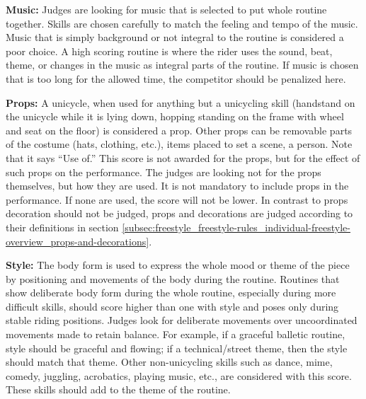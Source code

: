 \textbf{Music:} Judges are looking for music that is selected to put whole routine together.
Skills are chosen carefully to match the feeling and tempo of the music.
Music that is simply background or not integral to the routine is considered a poor choice.
A high scoring routine is where the rider uses the sound, beat, theme, or changes in the music as integral parts of the routine.
If music is chosen that is too long for the allowed time, the competitor should be penalized here.

\textbf{Props:} 
A unicycle, when used for anything but a unicycling skill (handstand on the unicycle while it is lying down, hopping standing on the frame with wheel and seat on the floor) is considered a prop.
Other props can be removable parts of the costume (hats, clothing, etc.), items placed to set a scene, a person.
Note that it says “Use of.” This score is not awarded for the props, but for the effect of such props on the performance.
The judges are looking not for the props themselves, but how they are used.
It is not mandatory to include props in the performance. If none are used, the score will not be lower.
In contrast to props decoration should not be judged, props and decorations are judged according to their definitions in section \ref{subsec:freestyle_freestyle-rules_individual-freestyle-overview_props-and-decorations}.

\textbf{Style:} The body form is used to express the whole mood or theme of the piece by positioning and movements of the body during the routine.
Routines that show deliberate body form during the whole routine, especially during more difficult skills, should score higher than one with style and poses only during stable riding positions.
Judges look for deliberate movements over uncoordinated movements made to retain balance.
For example, if a graceful balletic routine, style should be graceful and flowing; if a technical/street theme, then the style should match that theme.
Other non-unicycling skills such as dance, mime, comedy, juggling, acrobatics, playing music, etc., are considered with this score.
These skills should add to the theme of the routine.

